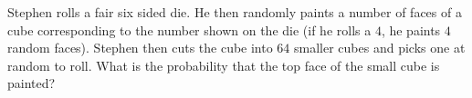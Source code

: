 Stephen rolls a fair six sided die. He then randomly paints a number of faces of a cube corresponding to the number shown on the die (if he rolls a $4$, he paints $4$ random faces). Stephen then cuts the cube into $64$ smaller cubes and picks one at random to roll. What is the probability that the top face of the small cube is painted?
